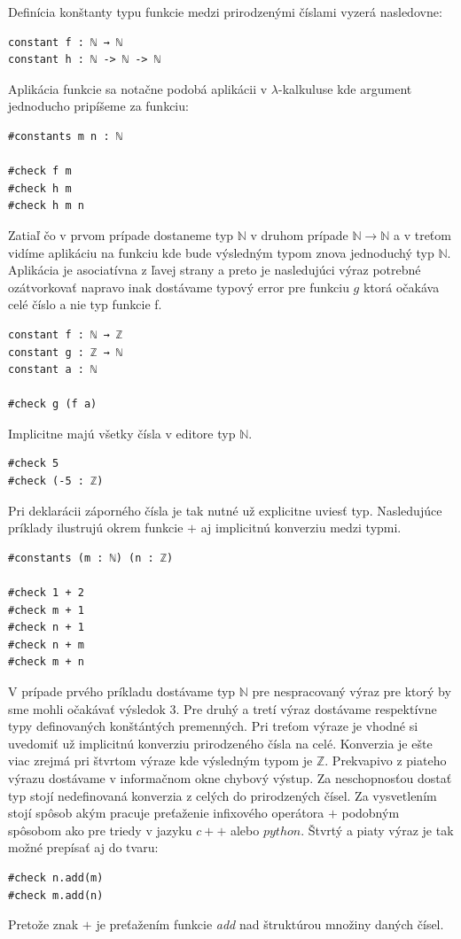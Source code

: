 \documentclass[a4paper,10pt,oneside]{report}%
\begin{document}
    Definícia konštanty typu funkcie medzi prirodzenými číslami vyzerá nasledovne:
\begin{lstlisting}
constant f : ℕ → ℕ
constant h : ℕ -> ℕ -> ℕ
\end{lstlisting}
    Aplikácia funkcie sa notačne podobá aplikácii v $\lambda$-kalkuluse kde argument
jednoducho pripíšeme za funkciu:
\begin{lstlisting}
#constants m n : ℕ

#check f m
#check h m
#check h m n
\end{lstlisting}
    Zatiaľ čo v prvom prípade dostaneme typ $\mathbb{N}$ v druhom prípade
$\mathbb{N} \to \mathbb{N}$ a v treťom vidíme aplikáciu na funkciu kde bude výsledným
typom znova jednoduchý typ $\mathbb{N}$.
    Aplikácia je asociatívna z ľavej strany a  preto je nasledujúci výraz potrebné 
ozátvorkovať napravo inak dostávame typový error pre funkciu $g$ ktorá očakáva 
celé číslo a nie typ funkcie f.
\begin{lstlisting}
constant f : ℕ → ℤ
constant g : ℤ → ℕ
constant a : ℕ

#check g (f a)
\end{lstlisting}
    Implicitne majú všetky čísla v editore typ $\mathbb{N}$.
\begin{lstlisting}
#check 5
#check (-5 : ℤ)
\end{lstlisting}
    Pri deklarácii záporného čísla je tak nutné už explicitne uviesť typ.
Nasledujúce príklady ilustrujú okrem funkcie $+$ aj implicitnú konverziu medzi typmi.
\begin{lstlisting}
#constants (m : ℕ) (n : ℤ)

#check 1 + 2
#check m + 1
#check n + 1
#check n + m
#check m + n
\end{lstlisting}
    V prípade prvého príkladu dostávame typ $\mathbb{N}$ pre nespracovaný výraz pre
ktorý by sme mohli očakávať výsledok $3$.
    Pre druhý a tretí výraz dostávame respektívne typy definovaných konštántých
premenných.
    Pri treťom výraze je vhodné si uvedomiť už implicitnú konverziu prirodzeného
čísla na celé.
    Konverzia je ešte viac zrejmá pri štvrtom výraze kde výsledným typom je
$\mathbb{Z}$.
    Prekvapivo z piateho výrazu dostávame v informačnom okne chybový výstup.
    Za neschopnosťou dostať typ stojí nedefinovaná konverzia z celých do prirodzených
čísel.
    Za vysvetlením stojí spôsob akým pracuje preťaženie infixového operátora $+$
podobným spôsobom ako pre triedy v jazyku $c++$ alebo $python$. Štvrtý a piaty
výraz je tak možné prepísať aj do tvaru:
\begin{lstlisting}
#check n.add(m)
#check m.add(n)
\end{lstlisting}
    Pretože znak $+$ je preťažením funkcie \emph{add} nad štruktúrou množiny daných
čísel.
\end{document}

